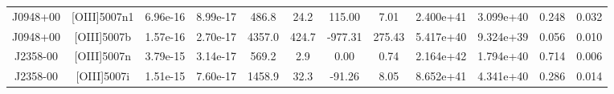 \begin{table}
\begin{tabular}{cccccccccccc}
J0948+00 & [OIII]5007n1 & 6.96e-16 & 8.99e-17 & 486.8 & 24.2 & 115.00 & 7.01 & 2.400e+41 & 3.099e+40 & 0.248 & 0.032 \\
J0948+00 & [OIII]5007b & 1.57e-16 & 2.70e-17 & 4357.0 & 424.7 & -977.31 & 275.43 & 5.417e+40 & 9.324e+39 & 0.056 & 0.010 \\
J2358-00 & [OIII]5007n & 3.79e-15 & 3.14e-17 & 569.2 & 2.9 & 0.00 & 0.74 & 2.164e+42 & 1.794e+40 & 0.714 & 0.006 \\
J2358-00 & [OIII]5007i & 1.51e-15 & 7.60e-17 & 1458.9 & 32.3 & -91.26 & 8.05 & 8.652e+41 & 4.341e+40 & 0.286 & 0.014 \\
\end{tabular}
\end{table}
